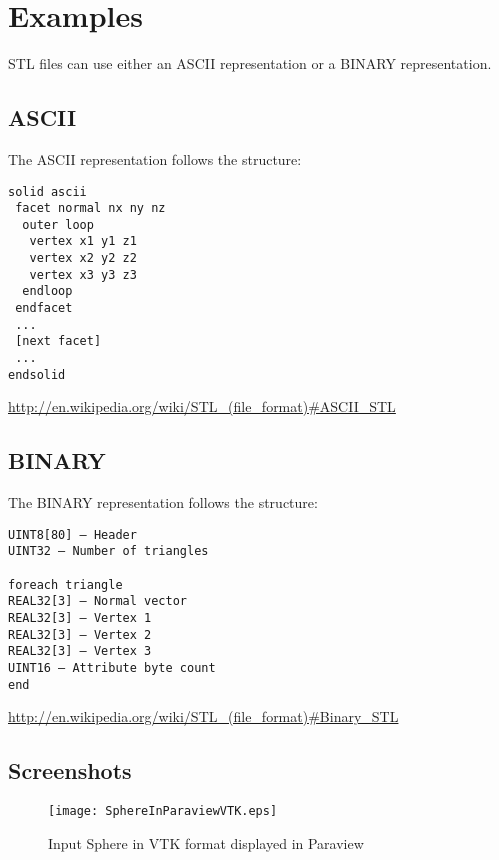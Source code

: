 \documentclass{InsightArticle}
\begin{document}
\begin{center}
\lstset{firstnumber=73}

\end{center}


\section{Examples}

STL files can use either an ASCII representation or a BINARY representation.

\subsection{ASCII}

The ASCII representation follows the structure:

\begin{lstlisting}
solid ascii
 facet normal nx ny nz
  outer loop
   vertex x1 y1 z1
   vertex x2 y2 z2
   vertex x3 y3 z3
  endloop
 endfacet
 ...
 [next facet]
 ...
endsolid
\end{lstlisting}

\begin{center}
\url{http://en.wikipedia.org/wiki/STL_(file_format)#ASCII_STL}
\end{center}

\subsection{BINARY}

The BINARY representation follows the structure:

\begin{lstlisting}
UINT8[80] – Header
UINT32 – Number of triangles

foreach triangle
REAL32[3] – Normal vector
REAL32[3] – Vertex 1
REAL32[3] – Vertex 2
REAL32[3] – Vertex 3
UINT16 – Attribute byte count
end
\end{lstlisting}

\begin{center}
\url{http://en.wikipedia.org/wiki/STL_(file_format)#Binary_STL}
\end{center}

\subsection{Screenshots}


\begin{figure}[!htb]
\centering
\texttt{[image: SphereInParaviewVTK.eps]}
\caption{Input Sphere in VTK format displayed in Paraview}
\end{figure}
\end{document}
